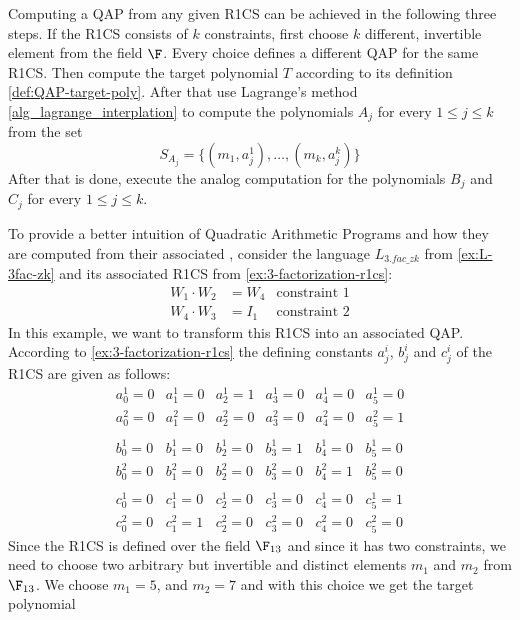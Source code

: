 Computing a QAP from any given R1CS can be achieved in the following three steps. If the R1CS consists of $k$ constraints, first choose $k$ different, invertible element from the field $\F$. Every choice defines a different QAP for the same R1CS. Then compute the target polynomial $T$ according to its definition \ref{def:QAP-target-poly}. After that use Lagrange's method \ref{alg_lagrange_interplation} to compute the polynomials $A_j$ for every $1\leq j \leq k$ from the set 
\begin{equation}
S_{A_j} = \{(m_1,a^1_j),\ldots,(m_k,a^k_j)\}
\end{equation}
After that is done, execute the analog computation for the polynomials $B_j$ and $C_j$ for every $1\leq j \leq k$. 
\begin{example}[3-factorization]
\label{ex:3-fac-QAP}  To provide a better intuition of Quadratic Arithmetic Programs and how they are computed from their associated , consider the language $L_{3.fac\_zk}$ from \examplename{} \ref{ex:L-3fac-zk} and its associated R1CS from \examplename{} \ref{ex:3-factorization-r1cs}:
\begin{align*}
W_1 \cdot W_2 & = W_4 & \text{constraint } 1\\
W_4 \cdot W_3 & = I_1 & \text{constraint } 2
\end{align*}
In this example, we want to transform this R1CS into an associated QAP. According to \examplename{} \ref{ex:3-factorization-r1cs} the defining constants $a_j^i$, $b_j^i$ and $c_j^i$ of the R1CS are given as follows:
$$
\begin{array}{llllll}
a_0^1 = 0 & a_1^1= 0 & a_2^1= 1 & a_3^1 = 0 & a_4^1= 0  & a_5^1= 0 \\ 
a_0^2 = 0 & a_1^2= 0 & a_2^2= 0 & a_3^2 = 0 & a_4^2= 0  & a_5^2= 1 \\ 
\\
b_0^1 = 0 & b_1^1= 0 & b_2^1= 0 & b_3^1 = 1 & b_4^1= 0  & b_5^1= 0 \\ 
b_0^2 = 0 & b_1^2= 0 & b_2^2= 0 & b_3^2 = 0 & b_4^2= 1  & b_5^2= 0 \\ 
\\
c_0^1 = 0 & c_1^1= 0 & c_2^1= 0 & c_3^1 = 0 & c_4^1= 0  & c_5^1= 1 \\ 
c_0^2 = 0 & c_1^2= 1 & c_2^2= 0 & c_3^2 = 0 & c_4^2= 0  & c_5^2= 0 
\end{array} 
$$
Since the R1CS is defined over the field $\F_{13}$ and since it has two constraints, we need to choose two arbitrary but invertible and distinct elements $m_1$ and $m_2$ from $\F_{13}$. We choose $m_{1}=5$, and $m_{2}=7$ and with this choice we get the target polynomial

\end{example}

